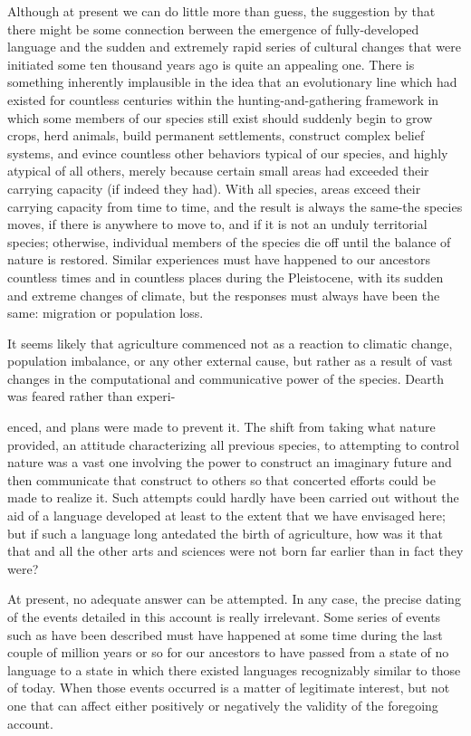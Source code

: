 Although at present we can do little more than guess, the sugges\-tion by \citet{Hockett1973} that there might be some connection berween the emergence of fully-developed language and the sudden and ex\-tremely rapid series of cultural changes that were initiated some ten thousand years ago is quite an appealing one. There is something inherently implausible in the idea that an evolutionary line which had existed for countless centuries within the hunting-and-gathering frame\-work in which some members of our species still exist should suddenly begin to grow crops, herd animals, build permanent settlements, con\-struct complex belief systems, and evince countless other behaviors typical of our species, and highly atypical of all others, merely because certain small areas had exceeded their carrying capacity (if indeed they had). With all species, areas exceed their carrying capacity from time to time, and the result is always the same-the species moves, if there is anywhere to move to, and if it is not an unduly territorial species; otherwise, individual members of the species die off until the balance of nature is restored. Similar experiences must have happened to our ancestors countless times and in countless places during the Pleistocene, with its sudden and extreme changes of climate, but the responses must always have been the same: migration or population loss.

It seems likely that agriculture commenced not as a reaction to climatic change, population imbalance, or any other external cause, but rather as a result of vast changes in the computational and com\-municative power of the species. Dearth was feared rather than experi-


enced, and plans were made to prevent it. The shift from taking what nature provided, an attitude characterizing all previous species, to attempting to control nature was a vast one involving the power to construct an imaginary future and then communicate that construct to others so that concerted efforts could be made to realize it. Such attempts could hardly have been carried out without the aid of a language developed at least to the extent that we have envisaged here; but if such a language long antedated the birth of agriculture, how was it that that and all the other arts and sciences were not born far earlier than in fact they were?

At present, no adequate answer can be attempted. In any case, the precise dating of the events detailed in this account is really irrele\-vant. Some series of events such as have been described must have happened at some time during the last couple of million years or so for our ancestors to have passed from a state of no language to a state in which there existed languages recognizably similar to those of today. When those events occurred is a matter of legitimate interest, but not one that can affect either positively or negatively the validity of the foregoing account.

